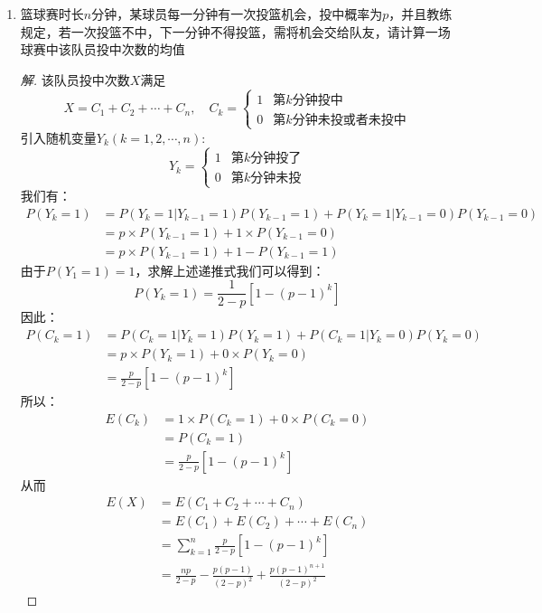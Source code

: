 \documentclass[12pt]{article}
\newcommand{\hei}{\CJKfamily{hei}}                          %
\begin{document}
\begin{enumerate}
\item {\hei 篮球赛时长$n$分钟，某球员每一分钟有一次投篮机会，投中概率为$p$，并且教练规定，若一次投篮不中，下一分钟不得投篮，需将机会交给队友，请计算一场球赛中该队员投中次数的均值}
\begin{proof}[解]
	该队员投中次数$X$满足
	\begin{equation}
	X=C_1+C_2+\cdots+C_n,\quad C_k=\left\{
	\begin{array}{cc}
	1 & \mbox{第$k$分钟投中}\\
	0 & \mbox{第$k$分钟未投或者未投中}
	\end{array}
	\right.
	\end{equation}
	引入随机变量$Y_k(k=1,2,\cdots,n)$:
	\begin{equation}
	Y_k=\left\{
	\begin{array}{cc}
	1 & \mbox{第$k$分钟投了}\\
	0 & \mbox{第$k$分钟未投}
	\end{array}
	\right.
	\end{equation}
	我们有：
	\begin{equation}
	\begin{aligned}
	P(Y_k=1)&=P(Y_k=1|Y_{k-1}=1)P(Y_{k-1}=1)+P(Y_k=1|Y_{k-1}=0)P(Y_{k-1}=0) \\
	&=p\times P(Y_{k-1}=1)+1\times P(Y_{k-1}=0) \\
	&=p\times P(Y_{k-1}=1)+1- P(Y_{k-1}=1)
	\end{aligned}
	\end{equation}
	由于$P(Y_1=1)=1$，求解上述递推式我们可以得到：
	\begin{equation}
	P(Y_k=1)=\frac{1}{2-p}\left[1-(p-1)^k\right]
	\end{equation}
	因此：
	\begin{equation}
	\begin{aligned}
	P(C_k=1)&=P(C_k=1|Y_k=1)P(Y_k=1)+P(C_k=1|Y_k=0)P(Y_k=0) \\
	&=p\times P(Y_k=1) + 0\times P(Y_k=0) \\
	&=\frac{p}{2-p}\left[1-(p-1)^k\right]
	\end{aligned}
	\end{equation}
	所以：
	\begin{equation}
	\begin{aligned}
	E(C_k)&=1\times P(C_k=1) + 0\times P(C_k=0) \\
	&=P(C_k=1) \\
	&=\frac{p}{2-p}\left[1-(p-1)^k\right]
	\end{aligned}
	\end{equation}
	从而\begin{equation}
	\begin{aligned}
	E(X)&=E(C_1+C_2+\cdots+C_n)\\
	&=E(C_1)+E(C_2)+\cdots+E(C_n) \\
	&=\sum_{k=1}^{n}\frac{p}{2-p}\left[1-(p-1)^k\right] \\
	&=\frac{np}{2-p}-\frac{p(p-1)}{(2-p)^2}+\frac{p(p-1)^{n+1}}{(2-p)^2}
	\end{aligned}
	\end{equation}
\end{proof}


\end{enumerate}
\end{document}
